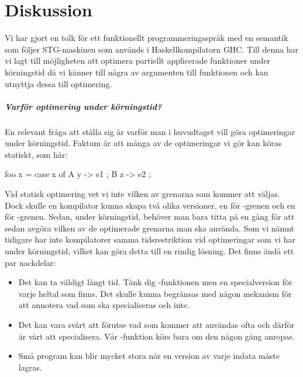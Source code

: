 \documentclass[Rapport]{subfiles}
\begin{document}
\chapter{Diskussion}
    
Vi har gjort en tolk för ett funktionellt programmeringsspråk
med en semantik som följer STG-maskinen som används i Haskellkompilatorn GHC.
Till denna har vi lagt till möjligheten att optimera partiellt applicerade funktioner under körningstid
då vi känner till några av argumenten till funktionen och kan utnyttja dessa till optimering.

\paragraph{Varför optimering under körningstid?}

En relevant fråga att ställa sig är varför man i huvudtaget vill göra optimeringar under körningstid. Faktum är att många av de optimeringar vi gör kan köras statiskt, som här:

\begin{codeEx}

foo x = case x of
        { A y  -> e1
        ; B z  -> e2
        };

\end{codeEx}

Vid statisk optimering vet vi inte vilken av grenarna som kommer att väljas. Dock skulle en kompilator kunna skapa två olika versioner, en för -grenen och en för 
-grenen. Sedan, under körningstid, behöver man bara titta på  en gång för att sedan avgöra vilken av de optimerade grenarna man ska använda.
Som vi nämnt tidigare har inte kompilatorer samma tidsrestriktion vid optimeringar som vi har under körningstid, vilket kan göra detta till en rimlig lösning. Det finns ändå ett par nackdelar:
\begin{itemize}
    \item Det kan ta väldigt långt tid. Tänk dig -funktionen men en specialversion för varje heltal som finns. Det skulle kunna begränsas med någon mekanism för att annotera vad som ska specialiseras och inte.
    \item Det kan vara svårt att förutse vad som kommer att användas ofta och därför är värt att specialisera. Vår -funktion körs bara om den någon gång anropas.
    \item Små program kan blir mycket stora när en version av varje indata måste lagras.
\end{itemize}
\end{document}
